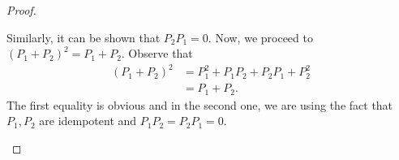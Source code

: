 \begin{proof}
\begin{description}
	    Similarly, it can be shown that $P_{2}P_{1} = 0$. Now, we proceed to $(P_{1} + P_{2})^{2} = P_{1} + P_{2}$. Observe that
	    \begin{align*}
		(P_{1} + P_{2})^{2} &= P_{1}^{2} + P_{1}P_{2} + P_{2}P_{1} + P_{2}^{2} \\
		&= P_{1} + P_{2}.
	    \end{align*}
	    The first equality is obvious and in the second one, we are using the fact that $P_{1}, P_{2}$ are idempotent and $P_{1}P_{2}=P_{2}P_{1} = 0$.
    \end{description}
\end{proof}
